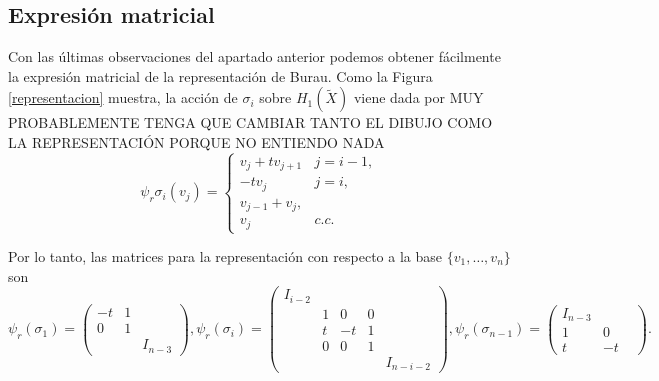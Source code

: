 \documentclass[TFG.tex]{subfiles}
\begin{document}


\subsection{Expresión matricial}
Con las últimas observaciones del apartado anterior podemos obtener fácilmente la expresión matricial de la representación de Burau. Como la Figura \ref{representacion} muestra, la acción de $\sigma_i$ sobre $H_1(\tilde{X})$ viene dada por
MUY PROBABLEMENTE TENGA QUE CAMBIAR TANTO EL DIBUJO COMO LA REPRESENTACIÓN PORQUE NO ENTIENDO NADA
\[
\psi_r\sigma_i(v_j)=\begin{cases}
v_j+tv_{j+1} & j=i-1,\\
-tv_j & j=i,\\
v_{j-1}+v_j,\\
v_j & c.c.
\end{cases}
\]

Por lo tanto, las matrices para la representación con respecto a la base $\{v_1,\dots, v_n\}$ son
\[
\psi_r(\sigma_1)=\begin{pmatrix}
-t & 1 & \\
0 & 1 & \\
& & I_{n-3}
\end{pmatrix},\psi_r(\sigma_i )=\begin{pmatrix}
I_{i-2} & & &\\
& 1 & 0 & 0 & \\
& t & -t & 1 & \\
& 0 & 0 & 1 & \\
& & & & I_{n-i-2}  
\end{pmatrix}, \psi_r(\sigma_{n-1})=\begin{pmatrix}
I_{n-3} & &\\
1 & 0 & \\
t & -t & 
\end{pmatrix}.
\]
\end{document}
